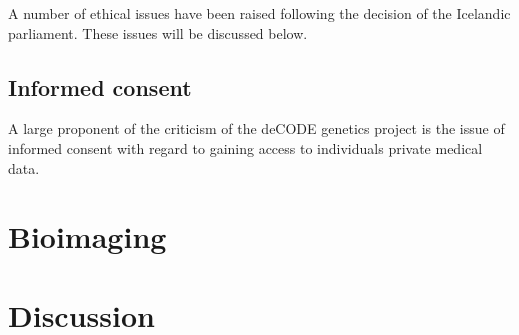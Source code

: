 \documentclass[a4paper, 12pt]{article}
\begin{document}
A number of ethical issues have been raised following the decision of
the Icelandic parliament. These issues will be discussed below.

\subsection{Informed consent}
A large proponent of the criticism of the deCODE genetics project is the issue
of informed consent with regard to gaining access to individuals private
medical data.

\section{Bioimaging}

\section{Discussion}

\printbibliography
\end{document}
